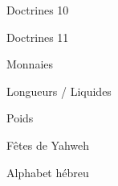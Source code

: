 \documentclass[11pt]{book}
\begin{document}
\begin{center}Doctrines 10\end{center}\clearpage
\begin{center}Doctrines 11\end{center}\clearpage
{}\clearpage
\begin{center}Monnaies\end{center}\clearpage
{}\clearpage
\begin{center}Longueurs / Liquides\end{center}\clearpage
{}\clearpage
\begin{center}Poids\end{center}\clearpage
{}\clearpage
\begin{center}Fêtes de Yahweh\end{center}\clearpage
{}\clearpage
\begin{center}Alphabet hébreu\end{center}\clearpage
\end{document}
